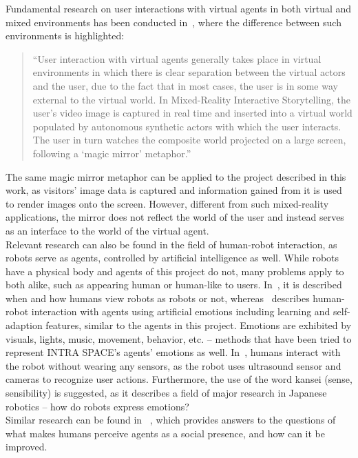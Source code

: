\documentclass[draft,final]{vutinfth} %
\begin{document}
Fundamental research on user interactions with virtual agents in both virtual and mixed environments has been conducted in~\cite{10.1007/978-3-540-39396-2_39}, where the difference between such environments is highlighted:
\begin{quote}
	``User interaction with virtual agents generally takes place in virtual environments in which there is clear separation between the virtual actors and the user, due to the fact that in most cases, the user is in some way external to the virtual world. In Mixed-Reality Interactive Storytelling, the user’s video image is captured in real time and inserted into a virtual world populated by autonomous synthetic actors with which the user interacts. The user in turn watches the composite world projected on a large screen, following a `magic mirror' metaphor.''~\cite[p.~1]{10.1007/978-3-540-39396-2_39}
\end{quote}
The same magic mirror metaphor can be applied to the project described in this work, as visitors’ image data is captured and information gained from it is used to render images onto the screen. 
However, different from such mixed-reality applications, the mirror does not reflect the world of the user and instead serves as an interface to the world of the virtual agent. \\
Relevant research can also be found in the field of human-robot interaction, as robots serve as agents, controlled by artificial intelligence as well. 
While robots have a physical body and agents of this project do not, many problems apply to both alike, such as appearing human or human-like to users. 
In~\cite{stenzel2012humanoid}, it is described when and how humans view robots as robots or not, whereas~\cite{suzuki1998intelligent} describes human-robot interaction with agents using artificial emotions including learning and self-adaption features, similar to the agents in this project. 
Emotions are exhibited by visuals, lights, music, movement, behavior, etc. – methods that have been tried to represent INTRA SPACE’s agents’ emotions as well. 
In~\cite{suzuki1998intelligent}, humans interact with the robot without wearing any sensors, as the robot uses ultrasound sensor and cameras to recognize user actions. 
Furthermore, the use of the word kansei (sense, sensibility) is suggested, as it describes a field of major research in Japanese robotics – how do robots express emotions? \\
Similar research can be found in ~\cite{pereira2014improving}, which provides answers to the questions of what makes humans perceive agents as a social presence, and how can it be improved. 
\end{document}
